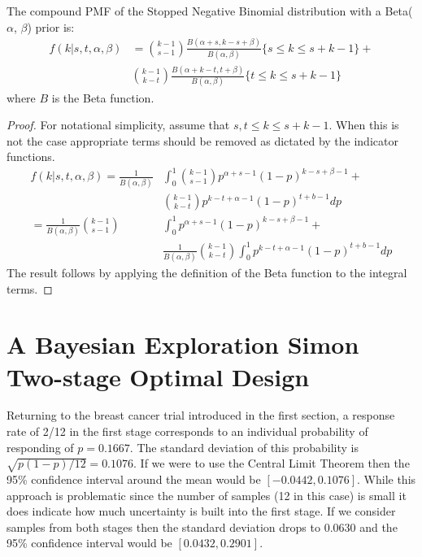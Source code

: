 \documentclass[12pt]{article}         %
\begin{document}
\begin{prop}
The compound PMF of the Stopped Negative Binomial distribution with a Beta($\alpha$, $\beta$) prior is:
\begin{align}
f(k | s, t, \alpha, \beta) &= {k-1 \choose s-1} \frac{B\left(\alpha+s, k-s+\beta \right)}{B(\alpha, \beta)} \{s \leq k \leq s+k-1\} + \nonumber \\
& {k-1 \choose k-t} \frac{B\left(\alpha + k - t, t+\beta\right)}{B(\alpha, \beta)} \{t \leq k \leq s+k-1\}
\end{align}
where $B$ is the Beta function.
\end{prop}
\begin{proof}
For notational simplicity, assume that $s,t \leq k \leq s+k-1$. When this is not the case appropriate terms should be removed as dictated by the indicator functions.
\begin{align*}
f(k | s, t, \alpha, \beta) = \frac{1}{B(\alpha, \beta)} & \int_0^1 {k-1 \choose s-1} p^{\alpha +s -1} \left(1-p\right)^{k-s+\beta-1} + \\
 & {k-1 \choose k-t} p^{k-t+\alpha-1}\left(1-p\right)^{t+b-1} dp \\
= \frac{1}{B(\alpha, \beta)}  {k-1 \choose s-1} & \int_0^1  p^{\alpha +s -1} \left(1-p\right)^{k-s+\beta-1} + \\
 & \frac{1}{B(\alpha, \beta)} {k-1 \choose k-t} \int_0^1  p^{k-t+\alpha-1}\left(1-p\right)^{t+b-1} dp
\end{align*}
The result follows by applying the definition of the Beta function to the integral terms.
\end{proof}

\section{A Bayesian Exploration Simon Two-stage Optimal Design}

Returning to the breast cancer trial introduced in the first section, a response rate of 2/12 in the first stage corresponds to an individual probability of responding of $p=0.1667$. The standard deviation of this probability is $\sqrt{p(1-p)/12}=0.1076$. If we were to use the Central Limit Theorem then the 95\% confidence interval around the mean would be $[-0.0442, 0.1076]$. While this approach is problematic since the number of samples (12 in this case) is small it does indicate how much uncertainty is built into the first stage. If we consider samples from both stages then the standard deviation drops to 0.0630 and the 95\% confidence interval would be $[0.0432, 0.2901]$.
\end{document}
